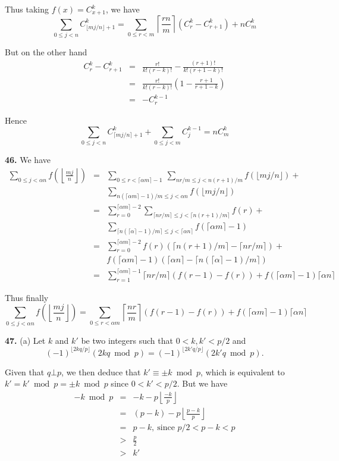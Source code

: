\documentclass[a4paper,12pt]{article}
\newcommand{\newpar}[1]{\bigskip \noindent \textbf{#1.}}
\newcommand{\subpar}[1]{\medskip \noindent (#1)}
\begin{document}
Thus taking $f(x) = C^k_{x+1}$, we have
\[  \sum_{0\le j<n} C^k_{\lfloor mj/n\rfloor + 1} =
  \sum_{0\le r<m} \left\lceil \frac{rn}{m} \right\rceil
  \left( C^k_r - C^k_{r+1}\right) + n C^k_m \]

But on the other hand
\begin{eqnarray*}
  C^k_r - C^k_{r+1} &=& \frac{r!}{k!(r-k)!} -
  \frac{(r+1)!}{k!(r+1-k)!} \\
  &=& \frac{r!}{k!(r-k)!} \left(1 - \frac{r+1}{r+1-k}\right) \\
  &=& - C^{k-1}_r
\end{eqnarray*}

Hence
\[\sum_{0\le j<n}C^k_{\lceil mj/n\rceil + 1} + \sum_{0\le j <m}
C^{k-1}_j = n C^k_m\]

\newpar{46} We have
\begin{eqnarray*}
  \sum_{0\le j< \alpha n} f\left( \left\lfloor \frac{mj}{n}
  \right\rfloor \right) &=&
  \sum_{0\le r < \lceil \alpha m\rceil-1}\ \sum_{ nr/m\le j < n(r+1)/m} f(\lfloor
  mj/n\rfloor) + \\
  && \sum_{n(\lceil \alpha m\rceil - 1)/m \le j < \alpha n} f(\lfloor mj/n\rfloor) \\
  &=& \sum_{r=0}^{\lceil \alpha m\rceil - 2}
  \sum_{\lceil nr/m \rceil \le j < \lceil n(r+1)/m\rceil} f(r) + \\
  && \sum_{\lceil n(\lceil \alpha\rceil - 1)/m \rceil \le j < \lceil \alpha n\rceil}
  f(\lceil \alpha m \rceil - 1)\\
  &=& \sum_{r=0}^{\lceil \alpha m\rceil -2}
  f(r)(\lceil n(r+1)/m\rceil - \lceil nr/m\rceil) + \\
  && f(\lceil \alpha m\rceil - 1)(\lceil \alpha n\rceil -
  \lceil n(\lceil\alpha\rceil - 1)/m\rceil) \\
  &=& \sum_{r=1}^{\lceil \alpha m\rceil - 1} \lceil nr/m\rceil (f(r-1)
  - f(r)) + f(\lceil \alpha m\rceil - 1) \lceil \alpha n\rceil
\end{eqnarray*}

Thus finally
\[ \sum_{0\le j<\alpha n}f\left( \left\lfloor \frac{mj}{n}
\right\rfloor \right) = \sum_{0\le r < \alpha m}\left\lceil
\frac{nr}{m} \right\rceil(f(r-1)-f(r)) + f(\lceil \alpha m\rceil -
1)\lceil \alpha n\rceil\]

\newpar{47} \subpar{a} Let $k$ and $k'$ be two integers such that
$0<k,k'< p/2$ and
\[ (-1)^{\lfloor 2kq/p\rfloor}(2kq \bmod p) = (-1)^{\lfloor
  2k'q/p\rfloor}(2k'q \bmod p).\]

Given that $q \bot p$, we then deduce that $k' \equiv \pm k \bmod p$,
which is equivalent to $k' = k'\bmod p = \pm k \bmod p$ since
$0<k'<p/2$.  But we have
\begin{eqnarray*}
  -k \bmod p &=& -k - p \left\lfloor \frac{-k}{p}\right\rfloor \\
  &=& (p - k) - p \left\lfloor \frac{p-k}{p}\right\rfloor \\
  &=& p-k,\ \mbox{since $p/2 < p-k < p$} \\
  &>& \frac{p}{2} \\
  &>& k'
\end{eqnarray*}
\end{document}
